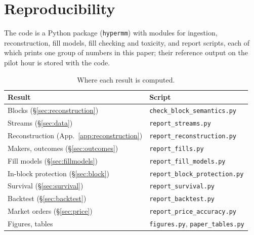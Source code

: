 \section{Reproducibility}
\label{app:repro}

The code is a Python package (\texttt{hypermm}) with modules for ingestion,
reconstruction, fill models, fill checking and toxicity, and report scripts, each
of which prints one group of numbers in this paper; their reference output on the
pilot hour is stored with the code. 

\begin{table}[h]
\centering\small
\caption{Where each result is computed.}
\label{tab:scripts}
\footnotesize\setlength{\tabcolsep}{3pt}
\begin{tabular}{@{}ll@{}}
\toprule
Result & Script \\
\midrule
Blocks (\S\ref{sec:reconstruction}) & \texttt{check\_block\_semantics.py} \\
Streams (\S\ref{sec:data}) & \texttt{report\_streams.py} \\
Reconstruction (App.~\ref{app:reconstruction}) & \texttt{report\_reconstruction.py} \\
Makers, outcomes (\S\ref{sec:outcomes}) & \texttt{report\_fills.py} \\
Fill models (\S\ref{sec:fillmodels}) & \texttt{report\_fill\_models.py} \\
In-block protection (\S\ref{sec:block}) & \texttt{report\_block\_protection.py} \\
Survival (\S\ref{sec:survival}) & \texttt{report\_survival.py} \\
Backtest (\S\ref{sec:backtest}) & \texttt{report\_backtest.py} \\
Market orders (\S\ref{sec:price}) & \texttt{report\_price\_accuracy.py} \\
Figures, tables & \texttt{figures.py}, \texttt{paper\_tables.py} \\
\bottomrule
\end{tabular}
\end{table}
